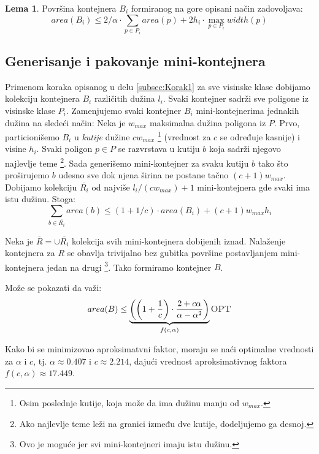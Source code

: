 \documentclass[a4paper]{article}
\theoremstyle{plain}
\theoremstyle{definition}
\newtheorem{lem}[thm]{Lema} %
\begin{document}
\begin{lem}
    Povr\v{s}ina kontejnera $B_{i}$ formiranog na gore opisani na\v{c}in zadovoljava: $$area(B_{i}) \leq 2/\alpha \cdot \sum_{p \in P_{i}}{area(p) + 2h_{i} \cdot \max_{p \in P_{i}}{width(p)}}$$
\end{lem}


\subsection{Generisanje i pakovanje mini-kontejnera}
\label{subsec:Korak2}

Primenom koraka opisanog u delu \ref{subsec:Korak1} za sve visinske klase dobijamo kolekciju kontejnera $B_{i}$ razli\v{c}itih du\v{z}ina $l_{i}$. Svaki kontejner sadr\v{z}i sve poligone iz visinske klase $P_{i}$. Zamenjujemo svaki kontejner $B_{i}$ mini-kontejnerima jednakih du\v{z}ina na slede\'c{}i na\v{c}in: Neka je $w_{max}$ maksimalna du\v{z}ina poligona iz $P$. Prvo, particioni\v{s}emo $B_{i}$ u \emph{kutije} du\v{z}ine $cw_{max}$ \footnote{Osim poslednje kutije, koja mo\v{z}e da ima du\v{z}inu manju od $w_{max}$.} (vrednost za $c$ se određuje kasnije) i visine $h_{i}$. Svaki poligon $p \in P$ se razvrstava u kutiju $b$ koja sadr\v{z}i njegovo najlevlje teme \footnote{Ako najlevlje teme le\v{z}i na granici između dve kutije, dodeljujemo ga desnoj.}. Sada generi\v{s}emo mini-kontejner za svaku kutiju $b$ tako \v{s}to pro\v{s}irujemo $b$ udesno sve dok njena \v{s}irina ne postane ta\v{c}no $(c+1)w_{max}$. Dobijamo kolekciju $\overline{R_{i}}$ od najvi\v{s}e $l_{i}/(cw_{max}) + 1$ mini-kontejnera gde svaki ima istu du\v{z}inu. Stoga:
$$\sum_{b \in \overline{R_{i}}}{area(b)} \leq (1 + 1/c) \cdot area(B_{i}) + (c+1)w_{max}h_{i}$$

Neka je $\overline{R} = \cup{\overline{R_{i}}}$ kolekcija svih mini-kontejnera dobijenih iznad. Nala\v{z}enje kontejnera za $R$ se obavlja trivijalno bez gubitka povr\v{s}ine postavljanjem mini-kontejnera jedan na drugi \footnote{Ovo je mogu\'c{}e jer svi mini-kontejneri imaju istu du\v{z}inu.}. Tako formiramo kontejner $B$.

Mo\v{z}e se pokazati da va\v{z}i: $$area(B) \leq \underbrace{\left(\left(1+\frac{1}{c}\right) \cdot \frac{2 + c\alpha}{\alpha - \alpha^{2}}\right)}_{f(c,\alpha)} \textsc{OPT}$$ 

Kako bi se minimizovao aproksimatvni faktor, moraju se na\'c{}i optimalne vrednosti za $\alpha$ i $c$, tj. $\alpha \approx 0.407$ i $c \approx 2.214$, daju\'c{}i vrednost aproksimativnog faktora $f(c, \alpha) \approx 17.449$.
\end{document}
